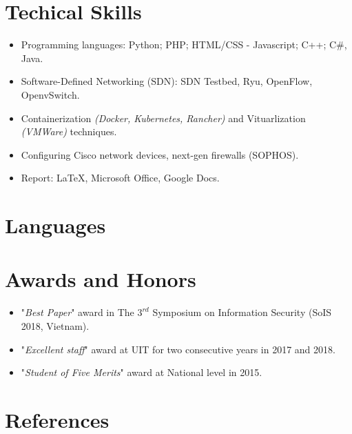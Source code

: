 \documentclass[11pt,a4paper,roman]{moderncv}        %
\begin{document}


\section{Techical Skills}
\begin{itemize}
  \item Programming languages: Python; PHP; HTML/CSS - Javascript; C++; C\#, Java.
  \item Software-Defined Networking (SDN): SDN Testbed, Ryu, OpenFlow, OpenvSwitch.
  \item Containerization \textit{(Docker, Kubernetes, Rancher)} and Vituarlization \textit{(VMWare)} techniques.
  \item Configuring Cisco network devices, next-gen firewalls (SOPHOS).
  \item Report: \LaTeX, Microsoft Office, Google Docs.
  \end{itemize}

\section{Languages}

\section{Awards and Honors}
\begin{itemize}
	\item "\textit{Best Paper}" award in The $3^{rd}$ Symposium on Information Security (SoIS 2018, Vietnam).
	\item "\textit{Excellent staff}" award at UIT for two consecutive years in 2017 and 2018. 
	\item "\textit{Student of Five Merits}" award at National level in 2015. 
\end{itemize}


\section{References}
\begin{cvcolumns}
  
\end{cvcolumns}
\end{document}

